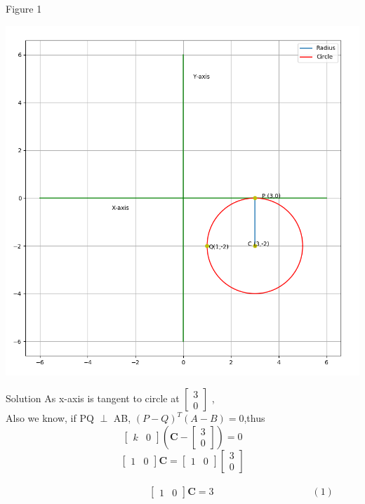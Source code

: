 \documentclass{beamer}
\begin{document}
\begin{frame}{Figure 1}
\begin{center}
\vspace{-0.75em}
\includegraphics[scale=0.39]{Fig_Circle1.png}
\end{center}
\end{frame}

\begin{frame}{Solution}
\vspace{2em}
As x-axis is tangent to circle at 
$
\begin{bmatrix}
3\\
0
\end{bmatrix}$
,\\
Also we know, if PQ $\perp$ AB, $(P-Q)^T(A-B) = 0$,thus
\[
\begin{bmatrix}
k & 0
\end{bmatrix} 
(\boldsymbol{C} -
\begin{bmatrix}
3\\
0
\end{bmatrix}
) = 0 
\]
\[
\begin{bmatrix}
1 & 0
\end{bmatrix} 
\boldsymbol{C} = 
\begin{bmatrix}
1 & 0
\end{bmatrix}
\begin{bmatrix}
3\\
0
\end{bmatrix}  
\]
\\
\[
\hspace{12em}
\begin{bmatrix}
1 & 0
\end{bmatrix} 
\boldsymbol{C} = 
3
\hspace{10em} (1)
\]
\end{frame}
\end{document}
